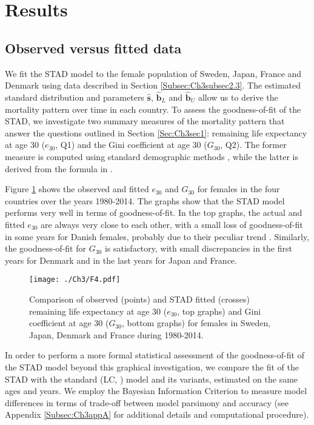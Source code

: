 \documentclass[Thesis]{subfiles}
\begin{document}
\section{Results}\label{Sec:Ch3sec3}

\subsection{Observed versus fitted data}\label{Subsec:Ch3subsec3.1}

We fit the STAD model to the female population of Sweden, Japan, France and Denmark using data described in Section \ref{Subsec:Ch3subsec2.3}. The estimated standard distribution and parameters $\hat{\bm{s}}$, $\hat{\bm{b}}_{L}$ and $\hat{\bm{b}}_{U}$ allow us to derive the mortality pattern over time in each country. To assess the goodness-of-fit of the STAD, we investigate two summary measures of the mortality pattern that answer the questions outlined in Section \ref{Sec:Ch3sec1}: remaining life expectancy at age 30 ($e_{30}$, Q1) and the Gini coefficient at age 30 ($G_{30}$, Q2). The former measure is computed using standard demographic methods \citep{preston2001demogr}, while the latter is derived from the formula in \cite{shkolnikov2003gini}.

Figure \ref{Fig:LifeExpFit} shows the observed and fitted $e_{30}$ and $G_{30}$ for females in the four countries over the years 1980-2014. The graphs show that the STAD model performs very well in terms of goodness-of-fit. In the top graphs, the actual and fitted $e_{30}$ are always very close to each other, with a small loss of goodness-of-fit in some years for Danish females, probably due to their peculiar trend \citep{christensen2010divergent,lindahl2016did,lindahl2016rise}. Similarly, the goodness-of-fit for $G_{30}$ is satisfactory, with small discrepancies in the first years for Denmark and in the last years for Japan and France.	

\begin{figure}[!ht]
	\begin{center}
		\texttt{[image: ./Ch3/F4.pdf]}
		\caption{Comparison of observed (points) and STAD fitted (crosses)
			remaining life expectancy at age 30 ($e_{30}$, top graphs) and Gini coefficient at age 30 ($G_{30}$, bottom graphs) for females in Sweden,
			Japan, Denmark and France during
			1980-2014.\label{Fig:LifeExpFit}}		
	\end{center}  
\end{figure}

In order to perform a more formal statistical assessment of the goodness-of-fit of the STAD model beyond this graphical investigation, we compare the fit of the STAD with the standard \citeauthor{lee1992modeling} (LC, \citeyear{lee1992modeling}) model and its variants, estimated on the same ages and years. We employ the Bayesian Information Criterion \citep[BIC,][]{schwarz1978estimating} to measure model differences in terms of trade-off between model parsimony and accuracy (see Appendix \ref{Subsec:Ch3appA} for additional details and computational procedure).
\end{document}

